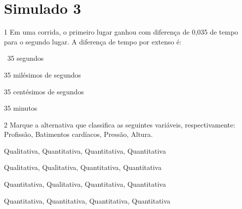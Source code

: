



\section*{Simulado 3}

\num{1} Em uma corrida, o primeiro lugar ganhou com diferença de 0,035 de
tempo para o segundo lugar. A diferença de tempo por extenso é:
\item~35 segundos
\item 35 milésimos de segundos
\item 35 centésimos de segundos~
\item 35 minutos






\num{2} Marque a alternativa que classifica as seguintes variáveis,
respectivamente: Profissão, Batimentos cardíacos, Pressão, Altura.
\item Qualitativa, Quantitativa, Quantitativa, Quantitativa
\item Qualitativa, Qualitativa, Quantitativa, Quantitativa
\item Quantitativa, Qualitativa, Quantitativa, Quantitativa
\item Quantitativa, Quantitativa, Quantitativa, Quantitativa


